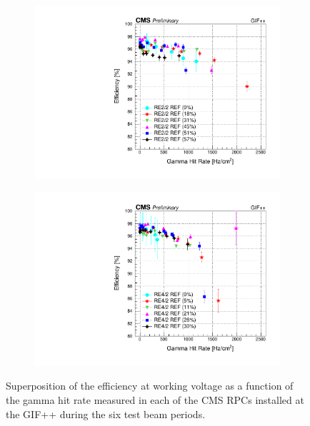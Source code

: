 \begin{figure}[H]
\begin{subfigure}{0.5\linewidth}
        	\caption{\label{fig:GIFpp_eff_vs_rate:B}}
    	\end{subfigure}
    	\begin{subfigure}{0.5\linewidth}
			\centering
    		\includegraphics[width = \linewidth]{fig/chapt5/RE2-2_REF_Efficiency_vs_Rate.pdf}
        	\caption{\label{fig:GIFpp_eff_vs_rate:C}}
    	\end{subfigure}
    	\begin{subfigure}{0.5\linewidth}
			\centering
    		\includegraphics[width = \linewidth]{fig/chapt5/RE4-2_REF_Efficiency_vs_Rate.pdf}
        	\caption{\label{fig:GIFpp_eff_vs_rate:D}}
    	\end{subfigure}
		\caption{\label{fig:GIFpp_eff_vs_rate} Superposition of the efficiency at working voltage as a function of the gamma hit rate measured in each of the CMS RPCs installed at the GIF++ during the six test beam periods.}
	\end{figure}
	
